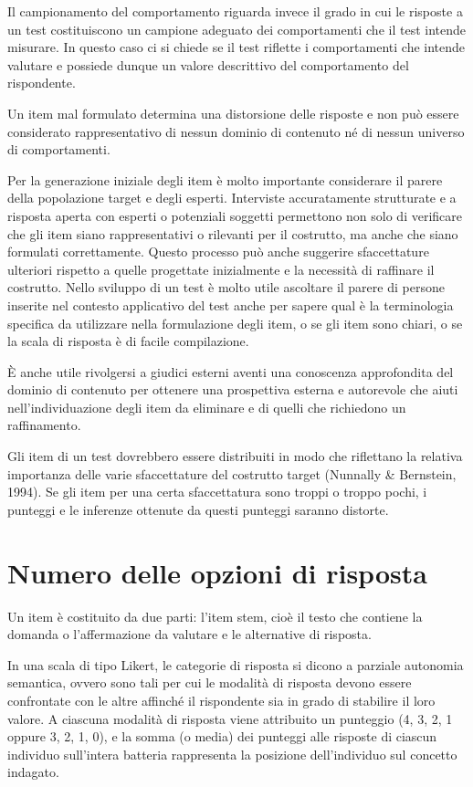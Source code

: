 Il campionamento del comportamento riguarda invece il grado in cui le risposte a un test costituiscono un campione adeguato dei comportamenti che il test intende misurare. In questo caso ci si chiede se il test riflette i comportamenti  che intende valutare e possiede dunque un valore descrittivo  del comportamento del rispondente.

Un item mal formulato determina una distorsione delle risposte e non può essere considerato rappresentativo di nessun dominio di contenuto né di nessun universo di comportamenti.

Per la generazione iniziale degli item è molto importante considerare il parere della popolazione target e degli esperti. Interviste accuratamente strutturate e a risposta aperta con esperti o potenziali soggetti permettono non solo di verificare che gli item siano rappresentativi o rilevanti per il costrutto, ma anche che siano formulati correttamente. Questo processo può anche suggerire sfaccettature ulteriori rispetto a quelle progettate inizialmente e la necessità di raffinare il costrutto. Nello sviluppo di un test è molto utile ascoltare il parere di persone inserite nel contesto applicativo del test anche per sapere qual è la terminologia specifica da utilizzare nella formulazione degli item, o se gli item sono chiari, o se la scala di risposta è di facile compilazione.

È anche utile rivolgersi a giudici esterni aventi una conoscenza approfondita del dominio di contenuto per ottenere una prospettiva esterna e autorevole che aiuti nell'individuazione degli item da eliminare  e di quelli che richiedono un raffinamento.

Gli item di un test dovrebbero essere distribuiti in modo che riflettano la relativa importanza delle varie sfaccettature del costrutto target (Nunnally \& Bernstein, 1994). Se gli item per una certa sfaccettatura sono troppi o troppo pochi, i punteggi e le inferenze ottenute da questi punteggi saranno distorte.


\section{Numero delle opzioni di risposta}

Un item è costituito da due parti: l'item stem, cioè il testo che contiene la domanda o l'affermazione da valutare e le alternative di risposta. 

In una scala di tipo Likert, le categorie di risposta si dicono a parziale autonomia semantica, ovvero sono tali per cui le modalità di risposta devono essere confrontate con le altre affinché il rispondente sia in grado di stabilire il loro valore.   A ciascuna modalità di risposta viene attribuito un punteggio (4, 3, 2, 1 oppure 3, 2, 1, 0), e la somma (o media) dei punteggi alle risposte di ciascun individuo sull'intera batteria rappresenta la posizione dell'individuo sul concetto indagato. 

